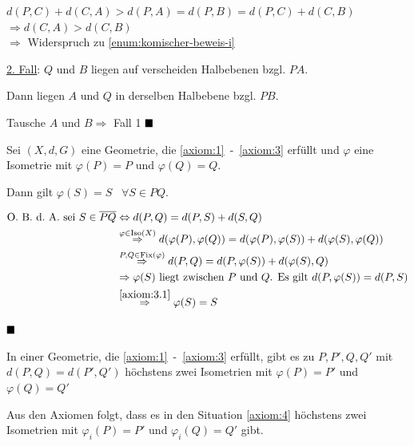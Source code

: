 \begin{beweis}
\begin{enumerate}[label=(\roman*)]
\begin{enumerate}[label=\alph*)]
                      $d(P,C) + d(C,A) > d(P,A) = d(P,B) = d(P,C) + d(C, B)$\\
                      $\Rightarrow d(C, A) > d(C, B)$\\
                      $\Rightarrow$ Widerspruch zu \cref{enum:komischer-beweis-i}
            \end{enumerate}
    \end{enumerate}

    \underline{2. Fall}: $Q$ und $B$ liegen auf verscheiden Halbebenen bzgl. $PA$.

    Dann liegen $A$ und $Q$ in derselben Halbebene bzgl. $PB$.

    Tausche $A$ und $B \Rightarrow$  Fall 1 $\qed$
\end{beweis}

\begin{bemerkung}\label{kor:beh2'}
    Sei $(X, d, G)$ eine Geometrie, die \ref{axiom:1}~-~\ref{axiom:3}
    erfüllt und $\varphi$ eine Isometrie mit $\varphi(P) = P$ und $\varphi(Q) = Q$.

    Dann gilt $\varphi(S) = S\;\;\;\forall S \in PQ$.
\end{bemerkung}

\begin{beweis}
    \begin{align}
        \text{\Obda sei } S \in \overline{PQ} &\Leftrightarrow d(P,Q) = d(P,S) + d(S,Q)\\
        &\overset{\varphi \in \Iso(X)}{\Rightarrow} d(\varphi(P),\varphi(Q)) = d(\varphi(P),\varphi(S)) + d(\varphi(S),\varphi(Q))\\
        &\overset{P, Q \in \Fix(\varphi)}{\Rightarrow} d(P, Q) = d(P,\varphi(S)) + d(\varphi(S), Q)\\
        &\Rightarrow \varphi(S) \text{ liegt zwischen } P \text{ und } Q \text{. Es gilt } d(P, \varphi(S)) = d(P,S)\\
        &\overset{\ref{axiom:3.1}}{\Rightarrow} \varphi(S) = S
    \end{align}

    $\qed$ 
\end{beweis}

\begin{proposition}%
    In einer Geometrie, die \ref{axiom:1}~-~\ref{axiom:3} erfüllt,
    gibt es zu $P, P', Q, Q'$ mit $d(P, Q) = d(P', Q')$ höchstens
    zwei Isometrien mit $\varphi(P) = P'$ und $\varphi(Q) = Q'$

    Aus den Axiomen  folgt, dass es in 
    den Situation \ref{axiom:4} höchstens zwei Isometrien mit
    $\varphi_i(P) = P'$ und $\varphi_i(Q) = Q'$ gibt.
\end{proposition}

